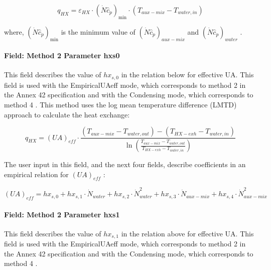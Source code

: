 \begin{equation}
{q_{HX}} = {\varepsilon_{HX}} \cdot {\left( {\dot N{{\hat c}_p}} \right)_{\min }} \cdot \left( {{T_{aux - mix}} - {T_{water,in}}} \right)
\end{equation}

where, \({\left( {\dot N{{\hat c}_p}} \right)_{\min }}\) is the minimum value of \({\left( {\dot N{{\hat c}_p}} \right)_{aux - mix}}\) and \({\left( {\dot N{{\hat c}_p}} \right)_{water}}\) .

\paragraph{Field: Method 2 Parameter hxs0}\label{field-method-2-parameter-hxs0}

This field describes the value of \(h{x_{s,0}}\) in the relation below for effective UA. This field is used with the EmpiricalUAeff mode, which corresponds to method 2 in the Annex 42 specification and with the Condensing mode, which corresponds to method 4 . This method uses the log mean temperature difference (LMTD) approach to calculate the heat exchange:

\begin{equation}
{q_{HX}} = {\left( {UA} \right)_{eff}} \cdot \frac{{\left( {{T_{aux - mix}} - {T_{water,out}}} \right) - \left( {{T_{HX - exh}} - {T_{water,in}}} \right)}}{{\ln \left( {\frac{{{T_{aux - mix}} - {T_{water,out}}}}{{{T_{HX - exh}} - {T_{water,in}}}}} \right)}}
\end{equation}

The user input in this field, and the next four fields, describe coefficients in an empirical relation for \({\left( {UA} \right)_{eff}}\) :

\begin{equation}
{\left( {UA} \right)_{eff}} = h{x_{s,0}} + h{x_{s,1}} \cdot {\dot N_{water}} + h{x_{s,2}} \cdot \dot N_{water}^2 + h{x_{s,3}} \cdot {\dot N_{aux - mix}} + h{x_{s,4}} \cdot \dot N_{aux - mix}^2
\end{equation}

\paragraph{Field: Method 2 Parameter hxs1}\label{field-method-2-parameter-hxs1}

This field describes the value of \(h{x_{s,1}}\) in the relation above for effective UA. This field is used with the EmpiricalUAeff mode, which corresponds to method 2 in the Annex 42 specification and with the Condensing mode, which corresponds to method 4 .

